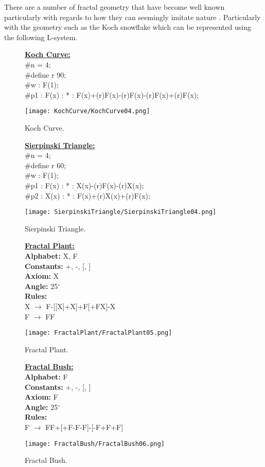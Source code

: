 There are a number of fractal geometry that have become well known particularly with regards to how they can seemingly imitate nature \cite{mandelbrot1982fractal}. Particularly with the geometry such as the Koch snowflake which can be represented using the following L-system.

\begin{figure}[htbp]
	\raggedright
	\textbf{\underline{Koch Curve:}} \\
	\#n = 4; \\
	\#define r 90; \\
	\#w : F(1); \\
	\#p1 : F(x) : * : F(x)+(r)F(x)-(r)F(x)-(r)F(x)+(r)F(x);\\
	{\centering
		\vspace{7px}
		\texttt{[image: KochCurve/KochCurve04.png]}
		\caption{Koch Curve.}
	}
\end{figure}
\begin{figure}[htbp]
	\raggedright
	\textbf{\underline{Sierpinski Triangle:}} \\
	\#n = 4;\\
	\#define r 60;\\
	\#w : F(1);\\
	\#p1 : F(x) : * : X(x)-(r)F(x)-(r)X(x);\\
	\#p2 : X(x) : * : F(x)+(r)X(x)+(r)F(x);\\
	{\centering
		\vspace{7px}
		\texttt{[image: SierpinskiTriangle/SierpinskiTriangle04.png]}
		\caption{Sierpinski Triangle.}
	}
\end{figure}
\begin{figure}[htbp]
	\raggedright
	\textbf{\underline{Fractal Plant:}} \\
	\textbf{Alphabet:} X, F\\
	\textbf{Constants:} +, -, [, ] \\
	\textbf{Axiom:} X \\
	\textbf{Angle:} 25$^\circ$ \\
	\textbf{Rules:} \\
	X $\rightarrow$ F-[[X]+X]+F[+FX]-X\\
	F $\rightarrow$ FF \\
	{\centering
		\vspace{7px}
		\texttt{[image: FractalPlant/FractalPlant05.png]}
		\caption{Fractal Plant.}
	}
\end{figure}
\begin{figure}[htbp]
	\raggedright
	\textbf{\underline{Fractal Bush:}} \\
	\textbf{Alphabet:} F\\
	\textbf{Constants:} +, -, [, ] \\
	\textbf{Axiom:} F \\
	\textbf{Angle:} 25$^\circ$ \\
	\textbf{Rules:} \\
	F $\rightarrow$ FF+[+F-F-F]-[-F+F+F]\\
	{\centering
		\vspace{7px}
		\texttt{[image: FractalBush/FractalBush06.png]}
		\caption{Fractal Bush.}
	}
\end{figure}

